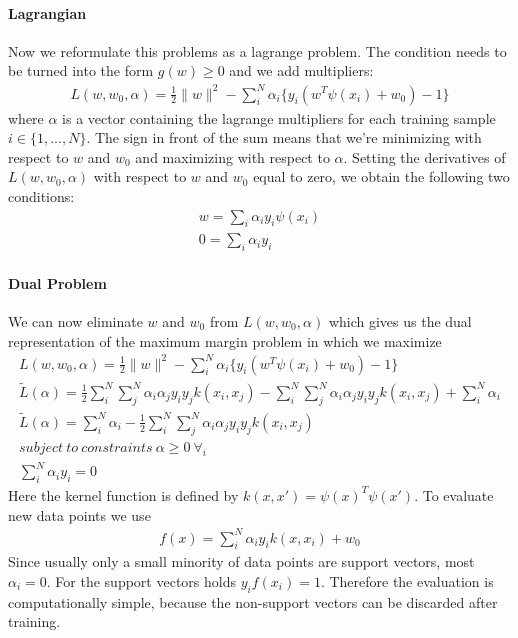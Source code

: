 \documentclass[main]{subfiles}
\begin{document}
\paragraph{Lagrangian}
Now we reformulate this problems as a lagrange problem. The condition needs to be turned into the form $g(w) \geq 0$ and we add multipliers:
\begin{align}
L(w,w_0,\alpha)=\frac{1}{2}\parallel w \parallel^2 - \sum_i^N \alpha_i \{y_i (w^T\psi(x_i) + w_0) - 1\}
\end{align}
where $\alpha$ is a vector containing the lagrange multipliers for each training sample $i \in \{1, ... ,N\}$. The sign in front of the sum means that we're minimizing with respect to $w$ and $w_0$ and maximizing with respect to $\alpha$. Setting the derivatives of $L(w,w_0,\alpha)$ with respect to $w$ and $w_0$ equal to zero, we obtain the following two conditions:
\begin{align}
w = \sum_i \alpha_i y_i \psi(x_i) \\
0 = \sum_i \alpha_i y_i
\end{align}
\paragraph{Dual Problem}
We can now eliminate $w$ and $w_0$ from $L(w,w_0,\alpha)$ which gives us the dual representation of the maximum margin problem in which we maximize
\begin{align}
L(w,w_0,\alpha)=\frac{1}{2}\parallel w \parallel^2 - \sum_i^N \alpha_i \{y_i (w^T\psi(x_i) + w_0) - 1\} \\
\tilde{L}(\alpha)=\frac{1}{2} \sum_i^N \sum_j^N \alpha_i \alpha_j y_i y_j k(x_i, x_j) - \sum_i^N \sum_j^N \alpha_i \alpha_j y_i y_j k(x_i, x_j) + \sum_i^N \alpha_i \\
\tilde{L}(\alpha)=\sum_i^N \alpha_i - \frac{1}{2} \sum_i^N \sum_j^N \alpha_i \alpha_j y_i y_j k(x_i, x_j) \\
subject \ to \ constraints \ \alpha  \geq 0 \ \forall_i \\
\sum_i^N \alpha_i y_i = 0
\end{align}
Here the kernel function is defined by $k(x, x')=\psi(x)^T \psi(x')$.
To evaluate new data points we use
\begin{align}
f(x)=\sum_i^N \alpha_i y_i k(x, x_i) + w_0
\end{align}
Since usually only a small minority of data points are support vectors, most $\alpha_i=0$. For the support vectors holds $y_if(x_i) = 1$. Therefore the evaluation is computationally simple, because the non-support vectors can be discarded after training. \newline
\end{document}
